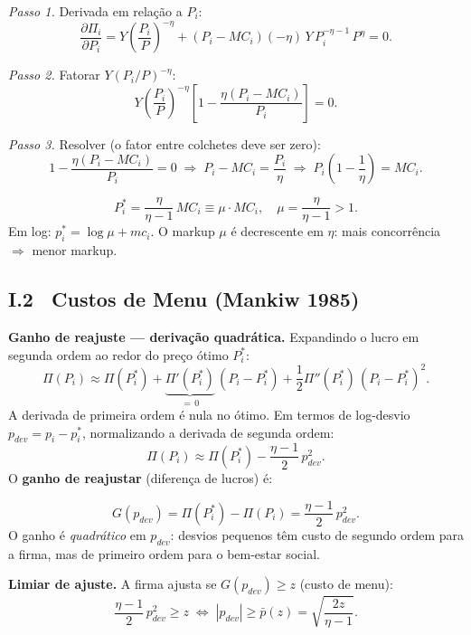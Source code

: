 \documentclass[12pt, a4paper]{article}
\begin{document}
\textit{Passo 1.} Derivada em relação a $P_i$:
\[
\frac{\partial\Pi_i}{\partial P_i} = Y\!\left(\frac{P_i}{P}\right)^{-\eta}
  + (P_i - MC_i)(-\eta)\,Y\,P_i^{-\eta-1}\,P^\eta = 0.
\]

\textit{Passo 2.} Fatorar $Y(P_i/P)^{-\eta}$:
\[
Y\!\left(\frac{P_i}{P}\right)^{-\eta}\!\!\left[1 - \frac{\eta(P_i - MC_i)}{P_i}\right] = 0.
\]

\textit{Passo 3.} Resolver (o fator entre colchetes deve ser zero):
\[
1 - \frac{\eta(P_i - MC_i)}{P_i} = 0
\;\Rightarrow\;
P_i - MC_i = \frac{P_i}{\eta}
\;\Rightarrow\;
P_i\!\left(1 - \frac{1}{\eta}\right) = MC_i.
\]

\begin{resultbox}[title={Preço ótimo com poder de mercado}]
\[
\boxed{P_i^* = \frac{\eta}{\eta-1}\,MC_i \equiv \mu\cdot MC_i,
\quad \mu = \frac{\eta}{\eta-1} > 1.}
\]
Em log: $p_i^* = \log\mu + mc_i$.
O markup $\mu$ é decrescente em $\eta$: mais concorrência $\Rightarrow$ menor markup.
\end{resultbox}

\subsection*{I.2 \ Custos de Menu (Mankiw 1985)}

\textbf{Ganho de reajuste — derivação quadrática.}
Expandindo o lucro em segunda ordem ao redor do preço ótimo $P_i^*$:
\[
\Pi(P_i) \approx \Pi(P_i^*) + \underbrace{\Pi'(P_i^*)}_{=\,0}\,(P_i - P_i^*)
  + \frac{1}{2}\Pi''(P_i^*)\,(P_i - P_i^*)^2.
\]
A derivada de primeira ordem é nula no ótimo. Em termos de log-desvio
$p_{dev} = p_i - p_i^*$, normalizando a derivada de segunda ordem:
\[
\Pi(P_i) \approx \Pi(P_i^*) - \frac{\eta-1}{2}\,p_{dev}^2.
\]
O \textbf{ganho de reajustar} (diferença de lucros) é:

\begin{formulabox}[title={Ganho de reajuste (Mankiw 1985)}]
\[
G(p_{dev}) = \Pi(P_i^*) - \Pi(P_i) = \frac{\eta-1}{2}\,p_{dev}^2.
\]
O ganho é \emph{quadrático} em $p_{dev}$: desvios pequenos têm custo de
segundo ordem para a firma, mas de primeiro ordem para o bem-estar social.
\end{formulabox}

\textbf{Limiar de ajuste.}
A firma ajusta se $G(p_{dev}) \geq z$ (custo de menu):
\[
\frac{\eta-1}{2}\,p_{dev}^2 \geq z
\;\Longleftrightarrow\;
|p_{dev}| \geq \bar{p}(z) = \sqrt{\frac{2z}{\eta-1}}.
\]
\end{document}
